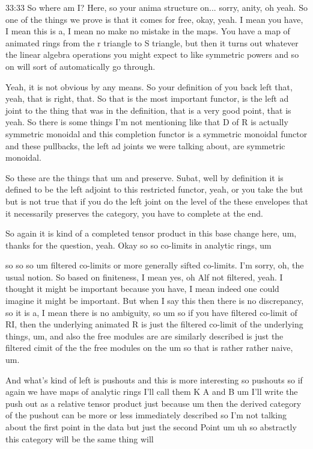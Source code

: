 \begin{unfinished}{33:33}
So where am I? Here, so your anima structure on... sorry, anity, oh yeah. So one of the things we prove is that it comes for free, okay, yeah. I mean you have, I mean this is a, I mean no make no mistake in the maps. You have a map of animated rings from the r triangle to S triangle, but then it turns out whatever the linear algebra operations you might expect to like symmetric powers and so on will sort of automatically go through. 

Yeah, it is not obvious by any means. So your definition of you back left that, yeah, that is right, that. So that is the most important functor, is the left ad joint to the thing that was in the definition, that is a very good point, that is yeah. So there is some things I'm not mentioning like that D of R is actually symmetric monoidal and this completion functor is a symmetric monoidal functor and these pullbacks, the left ad joints we were talking about, are symmetric monoidal. 

So these are the things that um and preserve. Subat, well by definition it is defined to be the left adjoint to this restricted functor, yeah, or you take the but but is not true that if you do the left joint on the level of the these envelopes that it necessarily preserves the category, you have to complete at the end. 

So again it is kind of a completed tensor product in this base change here, um, thanks for the question, yeah. Okay so so co-limits in analytic rings, um

 so so so um filtered co-limits or more generally sifted co-limits. I'm sorry, oh, the usual notion. So based on finiteness, I mean yes, oh Alf not filtered, yeah. I thought it might be important because you have, I mean indeed one could imagine it might be important. But when I say this then there is no discrepancy, so it is a, I mean there is no ambiguity, so um so if you have filtered co-limit of RI, then the underlying animated R is just the filtered co-limit of the underlying things, um, and also the free modules are are similarly described is just the filtered cimit of the the free modules on the um so that is rather rather naive, um. 

And what's kind of left is pushouts and this is more interesting so pushouts so if again we have maps of analytic rings I'll call them K A and B um I'll write the push out as a relative tensor product just because um then the derived category of the pushout can be more or less immediately described so I'm not talking about the first point in the data but just the second Point um uh so abstractly this category will be the same thing will


\end{unfinished}
